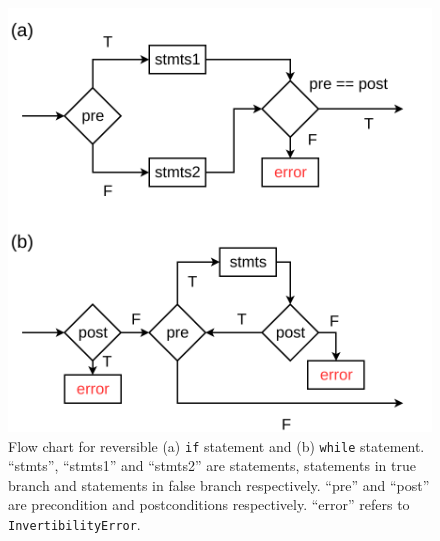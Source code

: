 \documentclass[aps,twocolumn,longbibliography,english,superscriptaddress]{revtex4-1}
\newcommand{\<}{\langle}
\renewcommand{\>}{\rangle}
\theoremstyle{definition}\newtheorem{definition}{\textit{Definition}}
\begin{document}
\begin{figure}
    \centerline{\includegraphics[width=0.8\columnwidth,trim={0 0cm 0 0cm},clip]{images/controlflow.pdf}}
    \caption{Flow chart for reversible (a) \texttt{if} statement and (b) \texttt{while} statement. ``stmts'', ``stmts1'' and ``stmts2'' are statements, statements in true branch and statements in false branch respectively. ``pre'' and ``post'' are precondition and postconditions respectively. ``error'' refers to \texttt{InvertibilityError}.}\label{fig:controlflow}
\end{figure}
\end{document}
